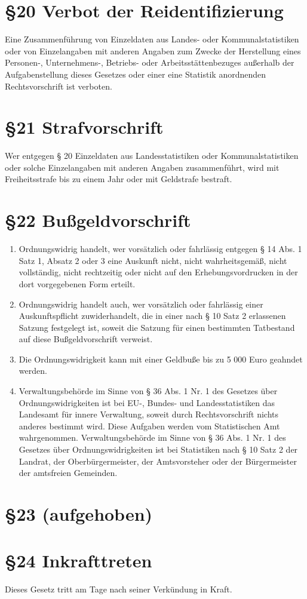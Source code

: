     \section{\S20 Verbot der Reidentifizierung}
    Eine Zusammenführung von Einzeldaten aus Landes- oder Kommunalstatistiken oder von Einzelangaben mit anderen Angaben zum Zwecke der Herstellung eines Personen-, Unternehmens-, Betriebs- oder Arbeitsstättenbezuges außerhalb der Aufgabenstellung dieses Gesetzes oder einer eine Statistik anordnenden Rechtsvorschrift ist verboten.

    \section{\S21 Strafvorschrift}
    Wer entgegen § 20 Einzeldaten aus Landesstatistiken oder Kommunalstatistiken oder solche Einzelangaben mit anderen Angaben zusammenführt, wird mit Freiheitsstrafe bis zu einem Jahr oder mit Geldstrafe bestraft.
 
    \section{\S22 Bußgeldvorschrift}
        \begin{enumerate}
            \item Ordnungswidrig handelt, wer vorsätzlich oder fahrlässig entgegen § 14 Abs. 1 Satz 1, Absatz 2 oder 3 eine Auskunft nicht, nicht wahrheitsgemäß, nicht vollständig, nicht rechtzeitig oder nicht auf den Erhebungsvordrucken in der dort vorgegebenen Form erteilt.
            \item Ordnungswidrig handelt auch, wer vorsätzlich oder fahrlässig einer Auskunftspflicht zuwiderhandelt, die in einer nach § 10 Satz 2 erlassenen Satzung festgelegt ist, soweit die Satzung für einen bestimmten Tatbestand auf diese Bußgeldvorschrift verweist.
            \item Die Ordnungswidrigkeit kann mit einer Geldbuße bis zu 5 000 Euro geahndet werden.
            \item Verwaltungsbehörde im Sinne von § 36 Abs. 1 Nr. 1 des Gesetzes über Ordnungswidrigkeiten ist bei EU-, Bundes- und Landesstatistiken das Landesamt für innere Verwaltung, soweit durch Rechtsvorschrift nichts anderes bestimmt wird. Diese Aufgaben werden vom Statistischen Amt wahrgenommen. Verwaltungsbehörde im Sinne von § 36 Abs. 1 Nr. 1 des Gesetzes über Ordnungswidrigkeiten ist bei Statistiken nach § 10 Satz 2 der Landrat, der Oberbürgermeister, der Amtsvorsteher oder der Bürgermeister der amtsfreien Gemeinden.
        \end{enumerate}

    \section{\S23 (aufgehoben)}
    
    \section{\S24 Inkrafttreten}
    Dieses Gesetz tritt am Tage nach seiner Verkündung in Kraft.
